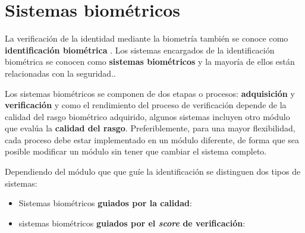 \section{Sistemas biométricos}\label{sec:SistemasBiometricos}

La verificación de la identidad mediante la biometría también se conoce como \textbf{identificación biométrica} \cite{li2009encyclopedia}. Los sistemas encargados de la identificación biométrica se conocen como \textbf{sistemas biométricos} y la mayoría de ellos están relacionadas con la seguridad..






Los sistemas biométricos se componen de dos etapas o procesos: \textbf{adquisición} y \textbf{verificación} y como el rendimiento del proceso de verificación depende de la calidad del rasgo biométrico adquirido, algunos sistemas incluyen otro módulo que evalúa la \textbf{calidad del rasgo}. Preferiblemente, para una mayor flexibilidad, cada proceso debe estar implementado en un módulo diferente, de forma que sea posible modificar un módulo sin tener que cambiar el sistema completo.

Dependiendo del módulo que que guíe la identificación se distinguen dos tipos de sistemas:
\begin{itemize}
    \item
    Sistemas biométricos \textbf{guiados por la calidad}:
    \item
    sistemas biométricos \textbf{guiados por el \textit{score} de verificación}:
\end{itemize}

